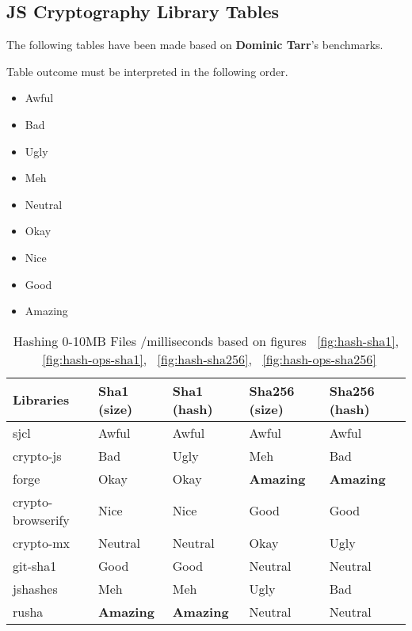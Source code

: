 
\subsection{JS Cryptography Library Tables}
The following tables have been made based on \textbf{Dominic Tarr}'s\cite {Tarr2014PerformanceLibraries.} benchmarks.

Table outcome must be interpreted in the following order.
\begin{multicols}{2}
\begin{itemize}
\item Awful
\item Bad
\item Ugly
\item Meh
\item Neutral
\item Okay
\item Nice
\item Good
\item Amazing
\end{itemize}
\end{multicols}

\begin{table}[htpb]
\centering
\caption{Hashing 0-10MB Files /milliseconds based on figures ~\ref{fig:hash-sha1}, ~\ref{fig:hash-ops-sha1}, ~\ref{fig:hash-sha256}, ~\ref{fig:hash-ops-sha256}}
\label{tab:hashing-0-10mb-files}
\begin{adjustbox}{center, width=\columnwidth-20pt}
\begin{tabular}{|l|l|l|l|l|}
\hline
Libraries & Sha1 (size) & Sha1 (hash) & Sha256 (size) & Sha256 (hash)	\\ \hline
sjcl				& Awful	& Awful	& Awful	& Awful	\\ \hline
crypto-js			& Bad	& Ugly	& Meh	& Bad		\\ \hline
forge				& Okay	& Okay	& \textbf{Amazing}	& \textbf{Amazing}	\\ \hline
crypto-browserify	& Nice	& Nice	& Good	& Good		\\ \hline
crypto-mx           & Neutral	& Neutral	& Okay	& Ugly	\\ \hline
git-sha1            & Good	& Good	& Neutral	& Neutral		\\ \hline
jshashes            & Meh	& Meh	& Ugly	& Bad		\\ \hline
rusha               & \textbf{Amazing}	& \textbf{Amazing}	& Neutral	& Neutral		\\ \hline
\end{tabular}
\end{adjustbox}
\end{table}

